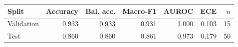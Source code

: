 \setcounter{table}{3}\label{tab:semantic_classifier_performance}
\begin{tabular}{lrrrrrr}
\toprule
Split & Accuracy & Bal. acc. & Macro-F1 & AUROC & ECE & \(n\) \\
\midrule
Validation & 0.933 & 0.933 & 0.931 & 1.000 & 0.103 & 15 \\
Test & 0.860 & 0.860 & 0.861 & 0.973 & 0.179 & 50 \\
\bottomrule
\end{tabular}
